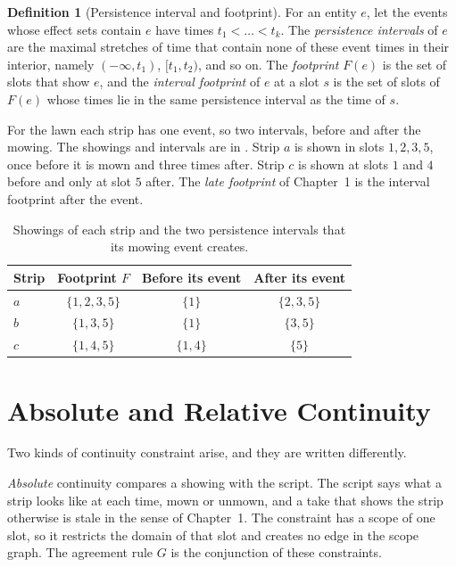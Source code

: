 \documentclass[11pt,twoside,openright]{book}
\theoremstyle{plain}
\theoremstyle{definition}
\newtheorem{definition}[theorem]{Definition}
\theoremstyle{remark}
\begin{document}
\begin{definition}[Persistence interval and footprint]\label{def:interval}
For an entity $e$, let the events whose effect sets contain $e$ have times $t_1<\dots<t_k$. The \emph{persistence intervals} of $e$ are the maximal stretches of time that contain none of these event times in their interior, namely $(-\infty,t_1)$, $[t_1,t_2)$, and so on. The \emph{footprint} $F(e)$ is the set of slots that show $e$, and the \emph{interval footprint} of $e$ at a slot $s$ is the set of slots of $F(e)$ whose times lie in the same persistence interval as the time of $s$.
\end{definition}

For the lawn each strip has one event, so two intervals, before and after the mowing. The showings and intervals are in . Strip $a$ is shown in slots $1,2,3,5$, once before it is mown and three times after. Strip $c$ is shown at slots $1$ and $4$ before and only at slot $5$ after. The \emph{late footprint} of Chapter~1 is the interval footprint after the event.

\begin{table}[ht]
\centering
\begin{tabular}{@{}lccc@{}}
\toprule
Strip & Footprint $F$ & Before its event & After its event\\
\midrule
$a$ & $\{1,2,3,5\}$ & $\{1\}$ & $\{2,3,5\}$\\
$b$ & $\{1,3,5\}$ & $\{1\}$ & $\{3,5\}$\\
$c$ & $\{1,4,5\}$ & $\{1,4\}$ & $\{5\}$\\
\bottomrule
\end{tabular}
\caption{Showings of each strip and the two persistence intervals that its mowing event creates.}\label{tab:intervals}
\end{table}

\section{Absolute and Relative Continuity}\label{sec:kinds}

Two kinds of continuity constraint arise, and they are written differently.

\emph{Absolute} continuity compares a showing with the script. The script says what a strip looks like at each time, mown or unmown, and a take that shows the strip otherwise is stale in the sense of Chapter~1. The constraint has a scope of one slot, so it restricts the domain of that slot and creates no edge in the scope graph. The agreement rule $G$ is the conjunction of these constraints.
\end{document}
